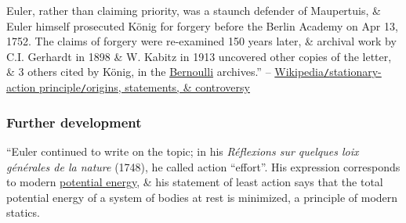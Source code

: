 \documentclass{article}
\begin{document}
\begin{enumerate}
	Euler, rather than claiming priority, was a staunch defender of Maupertuis, \& Euler himself prosecuted K\"onig for forgery before the Berlin Academy on Apr 13, 1752. The claims of forgery were re-examined 150 years later, \& archival work by C.I. Gerhardt in 1898 \& W. Kabitz in 1913 uncovered other copies of the letter, \& 3 others cited by K\"onig, in the \href{https://en.wikipedia.org/wiki/Bernoulli_family}{Bernoulli} archives.'' -- \href{https://en.wikipedia.org/wiki/Stationary-action_principle#Origins,_statements,_and_controversy}{Wikipedia{\tt/}stationary-action principle{\tt/}origins, statements, \& controversy}
\end{enumerate}

\subsubsection{Further development}
``Euler continued to write on the topic; in his \textit{R\'eflexions sur quelques loix g\'en\'erales de la nature} (1748), he called action ``effort''. His expression corresponds to modern \href{https://en.wikipedia.org/wiki/Potential_energy}{potential energy}, \& his statement of least action says that the total potential energy of a system of bodies at rest is minimized, a principle of modern statics.
\end{document}
